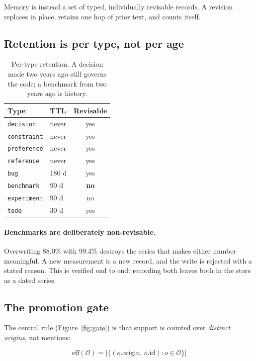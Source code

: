 \documentclass[10pt,twocolumn]{article}
\newcommand{\code}[1]{\texttt{\small #1}}
\begin{document}
Memory is instead a set of typed, individually revisable records. A revision replaces in
place, retains one hop of prior text, and counts itself.

\subsection{Retention is per type, not per age}

\begin{table}[h]
\centering\small
\begin{tabular}{@{}llc@{}}
\toprule
\textbf{Type} & \textbf{TTL} & \textbf{Revisable} \\
\midrule
\code{decision}    & never & yes \\
\code{constraint}  & never & yes \\
\code{preference}  & never & yes \\
\code{reference}   & never & yes \\
\code{bug}         & 180 d & yes \\
\code{benchmark}   & 90 d  & \textbf{no} \\
\code{experiment}  & 90 d  & no \\
\code{todo}        & 30 d  & yes \\
\bottomrule
\end{tabular}
\caption{Per-type retention. A decision made two years ago still governs the code; a
benchmark from two years ago is history.}
\end{table}

\paragraph{Benchmarks are deliberately non-revisable.} Overwriting 88.0\% with 99.4\%
destroys the series that makes either number meaningful. A new measurement is a new
record, and the write is rejected with a stated reason. This is verified end to end:
recording both leaves both in the store as a dated series.

\subsection{The promotion gate}

The central rule (Figure~\ref{fig:gate}) is that support is counted over \emph{distinct
origins}, not mentions:

\[
\text{eff}(\mathcal{O}) = \bigl|\{(o.\text{origin},\, o.\text{id}) : o \in \mathcal{O}\}\bigr|
\]
\end{document}

